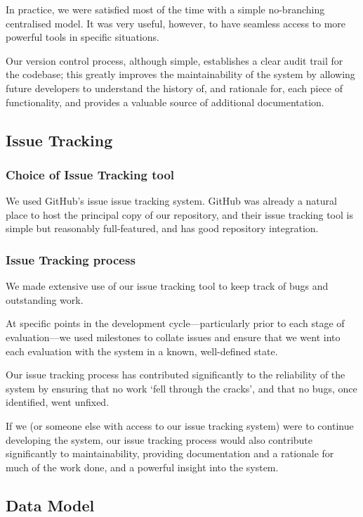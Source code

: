 In practice, we were satisfied most of the time with a simple
no-branching centralised model. It was very useful, however, to have
seamless access to more powerful tools in specific situations.

Our version control process, although simple, establishes a clear
audit trail for the codebase; this greatly improves the
maintainability of the system by allowing future developers to
understand the history of, and rationale for, each piece of
functionality, and provides a valuable source of additional
documentation.

\subsection{Issue Tracking}

\subsubsection{Choice of Issue Tracking tool}

We used GitHub's issue issue tracking system. GitHub was already a
natural place to host the principal copy of our repository, and their
issue tracking tool is simple but reasonably full-featured, and
has good repository integration.

\subsubsection{Issue Tracking process}

We made extensive use of our issue tracking tool to keep track of bugs
and outstanding work.

At specific points in the development cycle---particularly prior to
each stage of evaluation---we used milestones to collate issues and
ensure that we went into each evaluation with the system in a known,
well-defined state.

Our issue tracking process has contributed significantly to the
reliability of the system by ensuring that no work `fell through the
cracks', and that no bugs, once identified, went unfixed.

If we (or someone else with access to our issue tracking system) were
to continue developing the system, our issue tracking process would
also contribute significantly to maintainability, providing
documentation and a rationale for much of the work done, and a
powerful insight into the system.

\subsection{Data Model}

